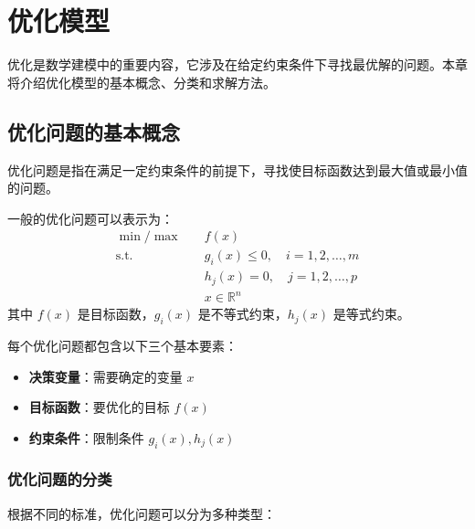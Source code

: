 
\chapter{优化模型}\label{chap:optimization}

优化是数学建模中的重要内容，它涉及在给定约束条件下寻找最优解的问题。本章将介绍优化模型的基本概念、分类和求解方法。

\section{优化问题的基本概念}\label{sec:optimization-concepts}

优化问题是指在满足一定约束条件的前提下，寻找使目标函数达到最大值或最小值的问题。

\begin{definition}[优化问题]\label{def:optimization-problem}
一般的优化问题可以表示为：
\begin{align}
\min/\max \quad & f(x) \\
\text{s.t.} \quad & g_i(x) \leq 0, \quad i = 1, 2, \ldots, m \\
& h_j(x) = 0, \quad j = 1, 2, \ldots, p \\
& x \in \mathbb{R}^n
\end{align}
其中 $f(x)$ 是目标函数，$g_i(x)$ 是不等式约束，$h_j(x)$ 是等式约束。
\end{definition}

\begin{infobox}[title=优化问题的组成要素]
每个优化问题都包含以下三个基本要素：
\begin{itemize}
    \item \textbf{决策变量}：需要确定的变量 $x$
    \item \textbf{目标函数}：要优化的目标 $f(x)$
    \item \textbf{约束条件}：限制条件 $g_i(x), h_j(x)$
\end{itemize}
\end{infobox}

\subsection{优化问题的分类}

根据不同的标准，优化问题可以分为多种类型：

